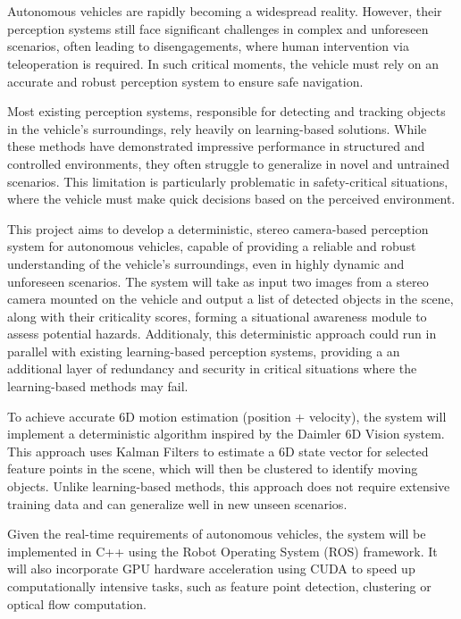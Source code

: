 \section{}%

Autonomous vehicles are rapidly becoming a widespread reality. However, their perception systems still face significant challenges 
in complex and unforeseen scenarios, often leading to disengagements, where human intervention via teleoperation is required. 
In such critical moments, the vehicle must rely on an accurate and robust perception system to ensure safe navigation. 

Most existing perception systems, responsible for detecting and tracking objects in the vehicle's surroundings, rely heavily
on learning-based solutions. While these methods have demonstrated impressive performance in structured and controlled environments, 
they often struggle to generalize in novel and untrained scenarios. This limitation is particularly problematic in safety-critical
situations, where the vehicle must make quick decisions based on the perceived environment.

This project aims to develop a deterministic, stereo camera-based perception system for autonomous vehicles, capable of providing
a reliable and robust understanding of the vehicle's surroundings, even in highly dynamic and unforeseen scenarios. The system
will take as input two images from a stereo camera mounted on the vehicle and output a list of detected objects in the scene, along
with their criticality scores, forming a situational awareness module to assess potential hazards. 
Additionaly, this deterministic approach could run in parallel with existing learning-based perception systems, providing a
an additional layer of redundancy and security in critical situations where the learning-based methods may fail.

To achieve accurate 6D motion estimation (position + velocity), the system will implement a deterministic algorithm 
inspired by the Daimler 6D Vision system. This approach uses Kalman Filters to estimate a 6D state vector for selected feature
points in the scene, which will then be clustered to identify moving objects. Unlike learning-based methods, this approach
does not require extensive training data and can generalize well in new unseen scenarios.

Given the real-time requirements of autonomous vehicles, the system will be implemented in C++ using the Robot Operating System (ROS)
framework. It will also incorporate GPU hardware acceleration using CUDA to speed up computationally intensive tasks, such as
feature point detection, clustering or optical flow computation.  

